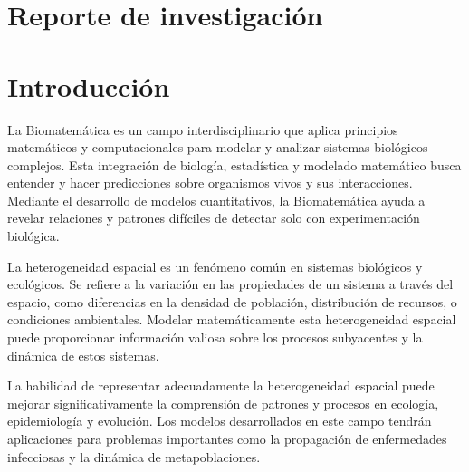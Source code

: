 \documentclass[fleqn,10pt]{SelfArx_063318} %
\affiliation{\textsuperscript{1}\textit{Centro de Neurociencias de Cuba, La Habana, Cuba, luisernesto.ibarra@cneuro.edu.cu, luise98cu@gmail.com}} %
\begin{document}
\flushbottom %

\maketitle %


\thispagestyle{empty} %


\section*{Reporte de investigación} %
\section{Introducción}

La Biomatemática es un campo interdisciplinario que aplica principios matemáticos y computacionales para modelar y 
analizar sistemas biológicos complejos. Esta integración de biología, estadística y modelado matemático busca 
entender y hacer predicciones sobre organismos vivos y sus interacciones. Mediante el desarrollo de modelos 
cuantitativos, la Biomatemática ayuda a revelar relaciones y patrones difíciles de detectar solo con experimentación 
biológica.

La heterogeneidad espacial es un fenómeno común en sistemas biológicos y ecológicos. Se refiere a la variación en las 
propiedades de un sistema a través del espacio, como diferencias en la densidad de población, distribución de recursos, 
o condiciones ambientales. Modelar matemáticamente esta heterogeneidad espacial puede proporcionar información valiosa 
sobre los procesos subyacentes y la dinámica de estos sistemas.

La habilidad de representar adecuadamente la heterogeneidad espacial puede mejorar significativamente la
comprensión de patrones y procesos en ecología, epidemiología y evolución. Los modelos desarrollados en este campo 
tendrán aplicaciones para problemas importantes como la propagación de enfermedades infecciosas y la dinámica de 
metapoblaciones.
\end{document}
